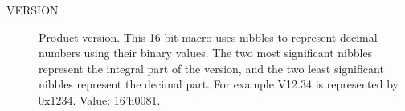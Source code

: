 \begin{description}
  \item[VERSION] Product version. This 16-bit macro uses nibbles to represent decimal numbers using their binary values. The two most significant nibbles represent the integral part of the version, and the two least significant nibbles represent the decimal part. For example V12.34 is represented by 0x1234. Value: 16'h0081.
\end{description}
